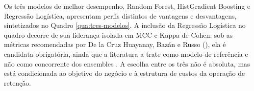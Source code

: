 Os três modelos de melhor desempenho, Random Forest, HistGradient Boosting e Regressão Logística, apresentam perfis distintos de vantagens e desvantagens, sintetizados no Quadro \ref{qua:tres-modelos}. A inclusão da Regressão Logística no quadro decorre de sua liderança isolada em MCC e Kappa de Cohen: sob as métricas recomendadas por De la Cruz Huayanay, Bazán e Russo (\citeyear{delacruz2025}), ela é candidata obrigatória, ainda que a literatura a trate como modelo de referência e não como concorrente dos ensembles \cite{prabadevi2023}. A escolha entre os três não é absoluta, mas está condicionada ao objetivo do negócio e à estrutura de custos da operação de retenção.

\begingroup
\label{qua:tres-modelos}
\ABNTEXfontereduzida
\SingleSpacing
